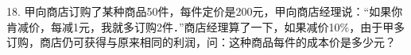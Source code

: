 18.	甲向商店订购了某种商品50件，每件定价是200元，甲向商店经理说：“如果你肯减价，每减1元，我就多订购2件．”商店经理算了一下，如果减价10$\%$，由于甲多订购，商店仍可获得与原来相同的利润，问：这种商品每件的成本价是多少元？



